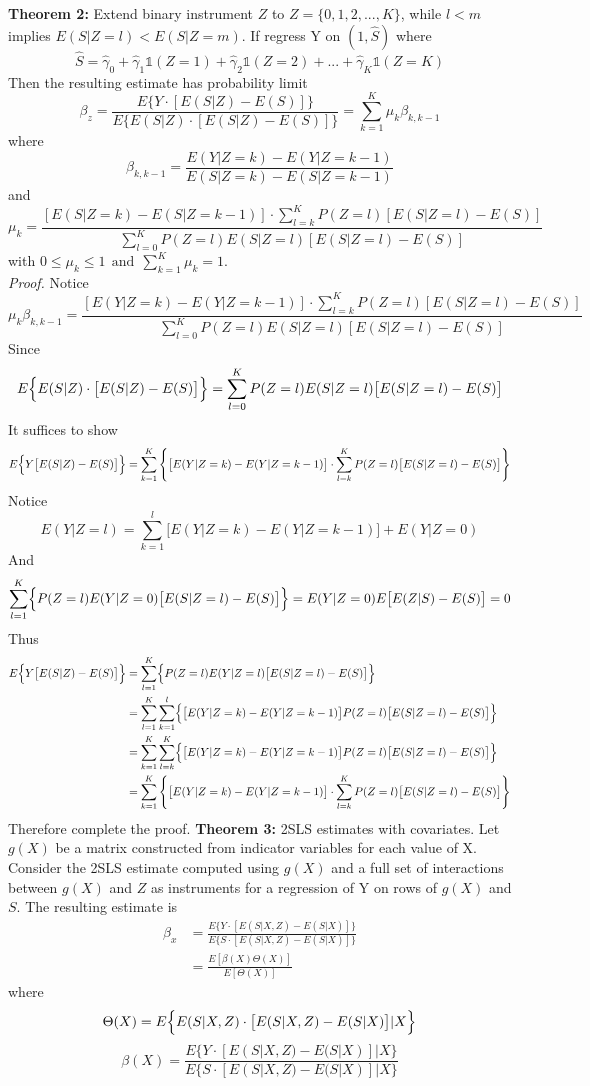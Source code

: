 \documentclass[a4paper,11pt]{article}
\begin{document}
\textbf{Theorem 2:} Extend binary instrument $Z$ to $Z=\{0,1,2,...,K\}$, while $l<m$ implies $E(S|Z=l)<E(S|Z=m)$.
If regress Y on $(1,\hat{S})$ where 
\[\hat{S}=\hat{\gamma}_0+\hat{\gamma}_1\mathbb{1}(Z=1)+\hat{\gamma}_2 \mathbb{1}(Z=2) +...+\hat{\gamma}_K \mathbb{1}(Z=K) \]
Then the resulting estimate has probability limit 
\[\beta_{z}=\frac{E\{Y \cdot[E(S|Z)-E(S)]\}}{E\{E(S|Z) \cdot[E(S|Z)-E(S)]\}}=\sum_{k=1}^{K} \mu_{k} \beta_{k, k-1}\]
where 
\[\beta_{k, k-1}=\frac{E(Y|Z=k)-E(Y|Z=k-1)}{E(S|Z=k)-E(S|Z=k-1)}\]
and
\[\mu_{k}=\frac{[E(S|Z=k)-E(S|Z=k-1)]\cdot \sum_{l=k}^{K} P(Z=l)[E(S|Z=l)-E(S)]}{\sum_{l=0}^{K} P(Z=l) E(S|Z=l)[E(S|Z=l)-E(S)]} \]
with $0 \leq \mu_{k} \leq 1 \ \ \text {and} \ \ \sum_{k=1}^{K} \mu_{k}=1$. \\
{\it Proof.} Notice
\[\mu_{k} \beta_{k, k-1}=\frac{[E(Y|Z=k)-E(Y|Z=k-1)]\cdot \sum_{l=k}^{K} P(Z=l)[E(S|Z=l)-E(S)]}{\sum_{l=0}^{K} P(Z=l) E(S|Z=l)[E(S|Z=l)-E(S)]}\]
Since 
\[E\Bigl\{E(S|Z) \cdot \bigl[E(S|Z)-E(S)\bigr]\Bigr\} =\sum_{l=0}^{K} P(Z=l) E(S|Z=l)\bigl[E(S|Z=l)-E(S)\bigr]\]
It suffices to show
\[E\Bigl\{Y \bigl[E(S|Z)-E(S)\bigr]\Bigr\}=\sum_{k=1}^K \left\{ \bigl[E(Y|Z=k)-E(Y|Z=k-1)\bigr]\cdot \sum_{l=k}^{K} P(Z=l)\bigl[E(S|Z=l)-E(S)\bigr] \right\} \]
Notice
\[E(Y|Z=l)=\sum_{k=1}^l \bigl[E(Y|Z=k)-E(Y|Z=k-1)\bigr]+E(Y|Z=0)\]
And
\[\sum_{l=1}^K\Bigl\{ P(Z=l) E(Y|Z=0) \bigl[E(S|Z=l)-E(S)\bigr] \Bigr\}=E(Y|Z=0)E\bigl[E(Z|S)-E(S)\bigr]=0 \]
Thus
\[\begin{aligned}
E\Bigl\{Y\bigl[E(S|Z)-E(S)\bigr]\Bigr\}&=\sum_{l=1}^K\Bigl\{ P(Z=l) E(Y|Z=l) \bigl[E(S|Z=l)-E(S)\bigr]\Bigr\} \\
&=\sum_{l=1}^K\sum_{k=1}^l\Bigl\{\bigl[E(Y|Z=k)-E(Y|Z=k-1)\bigr] P(Z=l) \bigl[E(S|Z=l)-E(S)\bigr]\Bigr\} \\
&=\sum_{k=1}^K\sum_{l=k}^K\Bigl\{\bigl[E(Y|Z=k)-E(Y|Z=k-1)\bigr] P(Z=l) \bigl[E(S|Z=l)-E(S)\bigr]\Bigr\} \\
&=\sum_{k=1}^K \left\{ \bigl[E(Y|Z=k)-E(Y|Z=k-1)\bigr]\cdot \sum_{l=k}^{K} P(Z=l)\bigl[E(S|Z=l)-E(S)\bigr] \right\}
\end{aligned}\]
Therefore complete the proof. 
\newpage
\noindent
\textbf{Theorem 3:} 2SLS estimates with covariates. Let $g(X)$ be a matrix constructed from indicator variables for each value of X. Consider the 2SLS estimate computed using $g(X)$ and a full set of interactions between $g(X)$ and $Z$ as instruments for a regression of Y on rows of $g(X)$ and $S$. The resulting estimate is 
\[\begin{aligned}
\beta_{x} &=\frac{E\{Y \cdot[E(S|X,Z)-E(S|X)]\}}{E\{S \cdot[E(S|X, Z)-E(S|X)]\}} \\
&=\frac{E[\beta(X) \Theta(X)]}{E[\Theta(X)]}
\end{aligned}\]
where
\[\Theta(X)=E\Bigl\{E(S|X,Z) \cdot \bigl[E(S|X,Z)-E(S|X)\bigr] | X\Bigr\}\]
\[\beta(X)=\frac{E\{Y \cdot[E(S|X,Z)-E(S|X)] | X\}} {E\{S \cdot[E(S |X,Z)-E(S|X)] | X\}}\]
\end{document}

